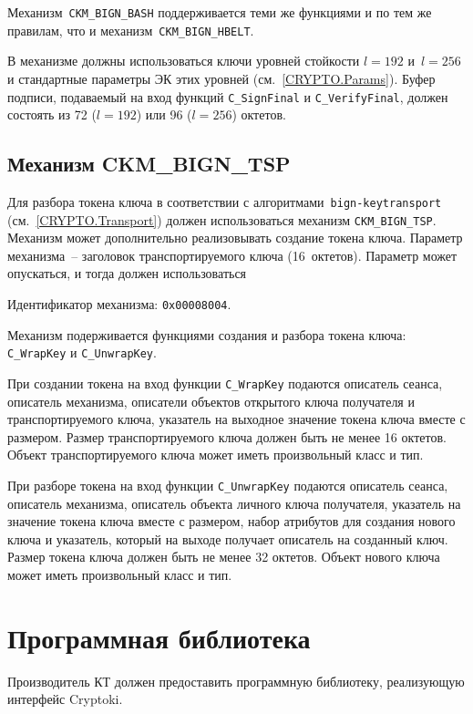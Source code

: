 Механизм~\verb|CKM_BIGN_BASH| поддерживается теми же функциями и по тем же 
правилам, что и механизм~\verb|CKM_BIGN_HBELT|.

В механизме должны использоваться ключи уровней стойкости $l=192$ и~$l=256$
и стандартные параметры ЭК этих уровней (см.~\ref{CRYPTO.Params}).
% 
Буфер подписи, подаваемый на вход функций \verb|C_SignFinal| и 
\verb|C_VerifyFinal|, должен состоять из 72 ($l=192$) или 96 ($l=256$) 
октетов. 

\subsection{Механизм CKM\_BIGN\_TSP}


Для разбора токена ключа в соответствии с алгоритмами~\texttt{bign-keytransport}
(см.~\ref{CRYPTO.Transport}) должен использоваться механизм \verb|CKM_BIGN_TSP|. 
Механизм может дополнительно реализовывать создание токена ключа.
%
Параметр механизма~-- заголовок транспортируемого ключа (16~октетов). 
Параметр может опускаться, и тогда должен использоваться

Идентификатор механизма: \texttt{0x00008004}.

Механизм подерживается функциями создания и разбора токена ключа:
\verb|C_WrapKey| и \verb|C_UnwrapKey|.

При создании токена на вход функции \verb|C_WrapKey| подаются
описатель сеанса, описатель механизма, описатели объектов открытого ключа
получателя и транспортируемого ключа, указатель на
выходное значение токена ключа вместе с размером.
Размер транспортируемого ключа должен быть не менее 16 октетов.
Объект транспортируемого ключа может иметь произвольный класс и тип.

При разборе токена на вход функции \verb|C_UnwrapKey| подаются
описатель сеанса, описатель механизма, описатель объекта личного ключа
получателя, указатель на значение токена ключа вместе с размером,
набор атрибутов для создания нового ключа и указатель,
который на выходе получает описатель на созданный ключ.
Размер токена ключа должен быть не менее 32 октетов.
Объект нового ключа может иметь произвольный класс и тип.

\section{Программная библиотека}

Производитель КТ должен предоставить программную библиотеку, реализующую
интерфейс Cryptoki. 

